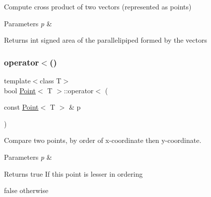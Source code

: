 Compute cross product of two vectors (represented as points) 


\begin{DoxyParams}{Parameters}
{\em p} & \\
\hline
\end{DoxyParams}
\begin{DoxyReturn}{Returns}
int signed area of the parallelipiped formed by the vectors 
\end{DoxyReturn}

\begin{DoxyCode}{0}

\end{DoxyCode}
\mbox{\label{classPoint_a7e220ceafc554dbb07185138eb3f4c20}} 
\subsubsection{\texorpdfstring{operator$<$()}{operator<()}}
{\footnotesize\ttfamily template$<$class T$>$ \\
bool \mbox{\hyperlink{classPoint}{Point}}$<$ T $>$\+::operator$<$ (\begin{DoxyParamCaption}\item[{const \mbox{\hyperlink{classPoint}{Point}}$<$ T $>$ \&}]{p }\end{DoxyParamCaption})\hspace{0.3cm}{\ttfamily [inline]}}



Compare two points, by order of x-\/coordinate then y-\/coordinate. 


\begin{DoxyParams}{Parameters}
{\em p} & \\
\hline
\end{DoxyParams}
\begin{DoxyReturn}{Returns}
true If \textquotesingle{}this\textquotesingle{} point is lesser in ordering 

false otherwise 
\end{DoxyReturn}

